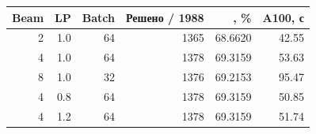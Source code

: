 \begin{tabular}{rrrrrr}
\toprule
Beam & LP & Batch & Решено / 1988 & \pass{}, \% & A100, с \\
\midrule
2 & 1.0 & 64 & 1365 & 68.6620 & 42.55 \\
4 & 1.0 & 64 & 1378 & 69.3159 & 53.63 \\
8 & 1.0 & 32 & 1376 & 69.2153 & 95.47 \\
4 & 0.8 & 64 & 1378 & 69.3159 & 50.85 \\
4 & 1.2 & 64 & 1378 & 69.3159 & 51.74 \\
\bottomrule
\end{tabular}
